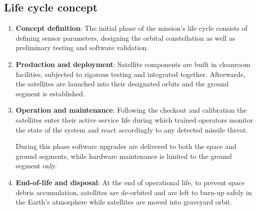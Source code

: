 \subsection{Life cycle concept}

\begin{enumerate}
    \item \textbf{Concept definition}: The initial phase of the mission's life cycle consists of defining sensor parameters, designing the orbital constellation as well as preliminary testing and software validation. 

    \item \textbf{Production and deployment}: Satellite components are built in cleanroom facilities, subjected to rigorous testing and integrated together. Afterwards, the satellites are launched into their designated orbits and the ground segment is established. 

    \item \textbf{Operation and maintenance}: Following the checkout and calibration the satellites enter their active service life during which trained operators monitor the state of the system and react accordingly to any detected missile threat.  
    
    During this phase software upgrades are delivered to both the space and ground segments, while hardware maintenance is limited to the ground segment only. 

    \item \textbf{End-of-life and disposal}: At the end of operational life, to prevent space debris accumulation,  satellites are de-orbited and are left to burn-up safely in the Earth's atmosphere while  satellites are moved into graveyard orbit. 
\end{enumerate}
